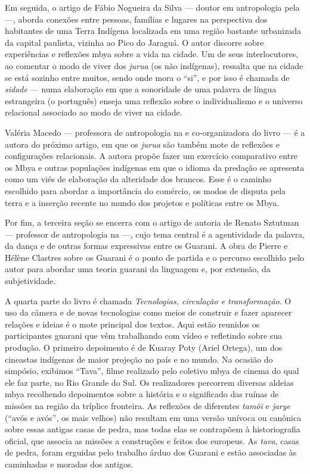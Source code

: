 Em seguida, o artigo de Fábio Nogueira da Silva --- doutor em antropologia
pela  ---, aborda conexões entre pessoas, famílias e lugares na
perspectiva dos habitantes de uma Terra Indígena localizada em uma
região bastante urbanizada da capital paulista, vizinha ao Pico do
Jaraguá. O autor discorre sobre experiências e reflexões mbya sobre a
vida na cidade. Um de seus interlocutores, ao comentar o modo de viver
dos \emph{jurua} (os não indígenas), ressalta que na cidade se está sozinho
entre muitos, sendo onde mora o ``si'', e por isso é chamada de \emph{sidade} ---
numa elaboração em que a sonoridade de uma palavra de língua
estrangeira (o português) enseja uma reflexão sobre o individualismo e
o universo relacional associado ao modo de viver na cidade.

Valéria Macedo --- professora de antropologia na  e co-organizadora
do livro --- é a autora do próximo artigo, em que os \emph{jurua} são também
mote de reflexões e configurações relacionais. A autora propõe fazer um
exercício comparativo entre os Mbya e outras populações indígenas em
que o idioma da predação se apresenta como um viés de elaboração da
alteridade dos brancos. Esse é o caminho escolhido para abordar a
importância do comércio, os modos de disputa pela terra e a inserção
recente no mundo dos projetos e políticas entre os Mbya. 

Por fim, a terceira seção se encerra com o artigo de autoria de Renato
Sztutman --- professor de antropologia na  ---, cujo tema central é a
agentividade da palavra, da dança e de outras formas expressivas entre
os Guarani. A obra de Pierre e Hélène Clastres sobre os Guarani é o
ponto de partida e o percurso escolhido pelo autor para abordar uma
teoria guarani da linguagem e, por extensão, da subjetividade. 

A quarta parte do livro é chamada \emph{Tecnologias, circulação e
transformação}. O uso da câmera e de novas tecnologias como meios de
construir e fazer aparecer relações e ideias é o mote principal dos
textos. Aqui estão reunidos os participantes guarani que vêm
trabalhando com vídeo e refletindo sobre sua produção. O primeiro
depoimento é de Kuaray Poty (Ariel Ortega), um dos cineastas indígenas
de maior projeção no país e no mundo. Na ocasião do simpósio, exibimos
``Tava'', filme realizado pelo coletivo mbya de cinema do qual ele faz
parte, no Rio Grande do Sul. Os realizadores percorrem diversas aldeias
mbya recolhendo depoimentos sobre a história e o significado das ruínas
de missões na região da tríplice fronteira. As reflexões de diferentes
\emph{tamõi} e \emph{jarye} (``avós e avós'', os mais velhos) não resultam em uma
versão unívoca ou canônica sobre essas antigas casas de pedra, mas
todas elas se contrapõem à historiografia oficial, que associa as
missões a construções e feitos dos europeus. As \emph{tava}, casas de pedra,
foram erguidas pelo trabalho árduo dos Guarani e estão associadas às
caminhadas e moradas dos antigos. 

